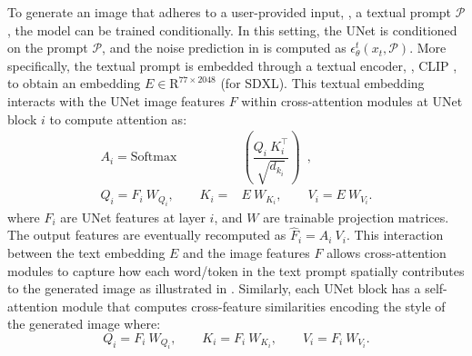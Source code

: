 To generate an image that adheres to a user-provided input, \eg, a textual prompt $\mathcal{P}$, the model can be trained conditionally.
In this setting, the UNet is conditioned on the prompt $\mathcal{P}$, and the noise prediction in  is computed as $\epsilon^t_\theta(x_t, \mathcal{P})$. 
More specifically, the textual prompt is embedded through a textual encoder, \eg, CLIP \citep{clip}, to obtain an embedding $E \in \mathrm{R}^{77 \times 2048}$ (for SDXL).
This textual embedding interacts with the UNet image features $F$ within cross-attention modules at UNet block $i$ to compute attention as:
\begin{equation}\label{eq:cn}
    \begin{aligned}
        A_i = \text{{Softmax}} & \left(\dfrac{Q_i \ K_i^\top}{\sqrt{{d_{k_i}}}}\right) \enspace ,\\    
        Q_i = F_i \ W_{Q_i},  \qquad K_i = &  E \ W_{K_i}, \qquad V_i =   E \ W_{V_i}.        
    \end{aligned}
\end{equation}
where $F_i$ are UNet features at layer $i$, and $W$ are trainable projection matrices.
The output features are eventually recomputed as $\hat{F}_i = A_i \ V_i$.
This interaction between the text embedding $E$ and the image features $F$ allows cross-attention modules to capture how each word/token in the text prompt spatially contributes to the generated image as illustrated in .
Similarly, each UNet block has a self-attention module that computes cross-feature similarities encoding the style of the generated image where: $$ Q_i = F_i \ W_{Q_i}, \qquad K_i = F_i \ W_{K_i}, \qquad V_i = F_i \ W_{V_i}.$$

